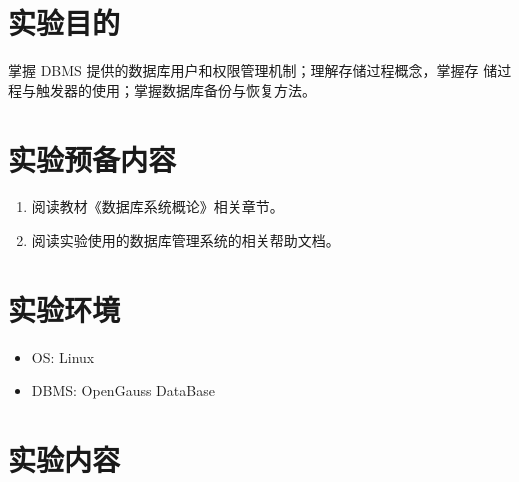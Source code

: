\section{实验目的}
掌握 DBMS 提供的数据库用户和权限管理机制；理解存储过程概念，掌握存
储过程与触发器的使用；掌握数据库备份与恢复方法。

\section{实验预备内容}
\begin{enumerate}
  \item 阅读教材《数据库系统概论》相关章节。
  \item 阅读实验使用的数据库管理系统的相关帮助文档。
\end{enumerate}

\section{实验环境}
\begin{itemize}
  \item OS: Linux
  \item DBMS: OpenGauss DataBase
\end{itemize}

\section{实验内容}

